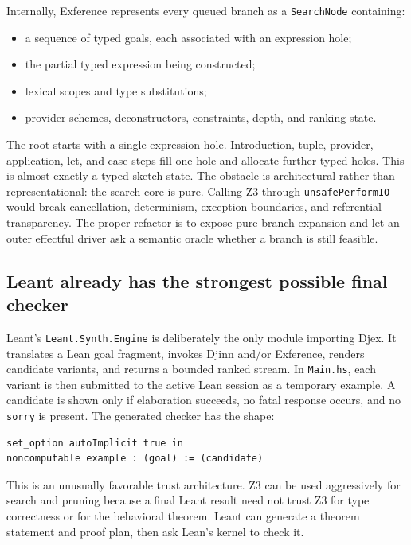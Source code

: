 \documentclass[11pt,oneside]{article}
\newcommand{\code}[1]{\texttt{#1}}
\newcommand{\filepath}[1]{\nolinkurl{#1}}
\begin{document}
Internally, Exference represents every queued branch as a \code{SearchNode} containing:

\begin{itemize}
  \item a sequence of typed goals, each associated with an expression hole;
  \item the partial typed expression being constructed;
  \item lexical scopes and type substitutions;
  \item provider schemes, deconstructors, constraints, depth, and ranking state.
\end{itemize}

The root starts with a single expression hole. Introduction, tuple, provider,
application, let, and case steps fill one hole and allocate further typed holes. This
is almost exactly a typed sketch state. The obstacle is architectural rather than
representational: the search core is pure. Calling Z3 through
\code{unsafePerformIO} would break cancellation, determinism, exception boundaries,
and referential transparency. The proper refactor is to expose pure branch expansion
and let an outer effectful driver ask a semantic oracle whether a branch is still
feasible.

\subsection{Leant already has the strongest possible final checker}

Leant's \filepath{Leant.Synth.Engine} is deliberately the only module importing Djex.
It translates a Lean goal fragment, invokes Djinn and/or Exference, renders candidate
variants, and returns a bounded ranked stream. In \filepath{Main.hs}, each variant is
then submitted to the active Lean session as a temporary example. A candidate is shown
only if elaboration succeeds, no fatal response occurs, and no \code{sorry} is present.
The generated checker has the shape:

\begin{lstlisting}[language=Lean,caption={Current Leant candidate checking boundary}]
set_option autoImplicit true in
noncomputable example : (goal) := (candidate)
\end{lstlisting}

This is an unusually favorable trust architecture. Z3 can be used aggressively for
search and pruning because a final Leant result need not trust Z3 for type correctness
or for the behavioral theorem. Leant can generate a theorem statement and proof plan,
then ask Lean's kernel to check it.
\end{document}

